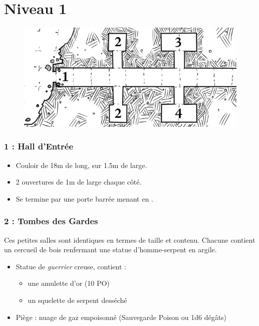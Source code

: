 \chapter{Niveau 1}
\begin{figure}[b]
  \centering
  \includegraphics[width=0.7\linewidth]{pics/map_1-4.jpg}
\end{figure}
\subsection{1 : Hall d’Entrée}\label{n1:s1}
\begin{itemize}
  \item Couloir de 18m de long, sur 1.5m de large.
  \item 2 ouvertures de 1m de large chaque côté. 
  \item Se termine par une porte barrée menant en \textbf{}.
\end{itemize}

\subsection{2 : Tombes des Gardes}\label{n1:s2}
Ces petites salles sont identiques en termes de taille et contenu. 
Chacune contient un cercueil de bois renfermant une statue d'homme-serpent en argile.

\begin{itemize}
  \item Statue de \emph{guerrier} creuse, contient :
  \begin{itemize}
    \item une amulette d’or (10 PO)
    \item un squelette de serpent desséché
  \end{itemize}
  \item Piège : nuage de gaz empoisonné (Sauvegarde Poison ou 1d6 dégâts)
\end{itemize}

%
\vfill\break
